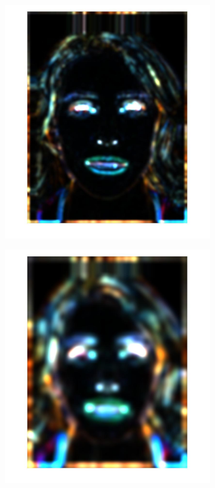 \documentclass[a4paper]{iacas}
\begin{document}
\begin{figure}[!htbp]
\begin{subfigure}[b]{0.15\textwidth}
		\includegraphics[width=\textwidth]{102.jpg}
		\caption{}
		\label{fig:102}
	\end{subfigure}
	\begin{subfigure}[b]{0.15\textwidth}
		\includegraphics[width=\textwidth]{103.jpg}

\end{subfigure}
\end{figure}
\end{document}
